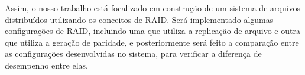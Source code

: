 	Assim, o nosso trabalho está focalizado em construção de um sistema de arquivos distribuídos utilizando os conceitos de RAID.
	Será implementado algumas configurações de RAID, incluindo uma que utiliza a replicação de arquivo e outra que utiliza a geração de paridade, e posteriormente será feito a comparação entre as configurações desenvolvidas no sistema, para verificar a diferença de desempenho entre elas.
	\\

	
	
	
	

 

	

